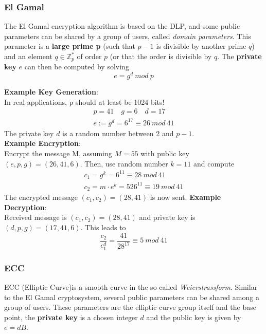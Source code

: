 \documentclass[a4paper, 10 pt, conference]{ieeeconf}
\begin{document}
\vspace{0.5cm}
\subsubsection{\textbf{El Gamal}}

The El Gamal encryption algorithm is based on the DLP, and some public parameters can be shared by a group of users, called \emph{domain parameters}. This parameter is a \textbf{large prime p} (such that $p-1$ is divisible by another prime $q$) and an element $q \in \mathbb{Z}^{*}_{p}$ of order $p$ (or that the order is divisible by $q$. The \textbf{private key} $e$ can then be computed by solving
\begin{equation*}
e = g^{d} \ mod \ p
\end{equation*}

\textbf{Example Key Generation}: \\
In real applications, p should at least be 1024 bits!
\begin{align*}
p = 41 \quad g = 6 \quad d = 17 \\
e := g^{d} = 6^{17} \equiv 26 \ mod \ 41
\end{align*}
The private key $d$ is a random number between 2 and $p-1$. \\
\textbf{Example Encryption}: \\
Encrypt the message M, assuming $M=55$ with public key $(e,p,g) = (26,41,6)$. Then, use random number $k=11$ and compute 
\begin{align*}
c_1 = g^{k} = 6^{11} \equiv 28 \ mod \ 41 \\
c_2 = m\cdot e^{k} = 526^{11} \equiv 19 \ mod \ 41
\end{align*}
The encrypted message $(c_1,c_2) = (28,41)$ is now sent. 
\textbf{Example Decryption}: \\
Received message is $(c_1,c_2) = (28,41)$ and private key is $(d,p,g) = (17,41,6)$. This leads to 
\begin{equation*}
\frac{c_2}{c_1^{d}} = \frac{41}{28^{17}} \equiv 5 \ mod \ 41
\end{equation*}

\subsubsection{\textbf{ECC}}
ECC (Elliptic Curve)is a smooth curve in the so called \emph{Weierstrassform}. 
Similar to the El Gamal cryptosystem, several public parameters can be shared among a group of users.
These parameters are the elliptic curve group itself and the base point, the \textbf{private key} is a chosen integer $d$ and the public key is given by $e=dB$. 
\end{document}
